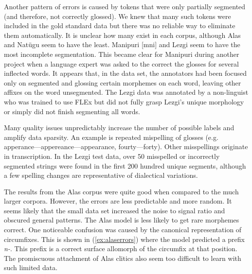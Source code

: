 Another pattern of errors is caused by tokens that were only partially segmented (and therefore, not correctly glossed). We knew that many such tokens were included in the gold standard data but there was no reliable way to eliminate them automatically. It is unclear how many exist in each corpus, although Alas and Nat\"ugu seem to have the least. Manipuri [mni] and Lezgi seem to have the most incomplete segmentation. This became clear for Manipuri during another project when a language expert was asked to the correct the glosses for several inflected words. It appears that, in the data set, the annotators had been focused only on segmented and glossing certain morphemes on each word, leaving other affixes on the word unsegmented. 
The Lezgi data was annotated by a non-linguist who was trained to use FLEx but did not fully grasp Lezgi's unique morphology or simply did not finish segmenting all words. 

Many quality issues unpredictably increase the number of possible labels and amplify data sparsity. An example is
repeated mispelling of glosses (e.g. apperance---appereance---appearance, fourty---forty). Other misspellings originate in transcription. In the Lezgi test data, over 50 misspelled or incorrectly segmented strings were found in the first 200 hundred unique segments, although a few spelling changes are representative of dialectical variations.  


The results from the Alas corpus were quite good when compared to the much larger corpora. However, the errors are less predictable and more random. It seems likely that the small data set increased the noise to signal ratio and obscured general patterns. 
The Alas model is less likely to get rare morphemes correct. 
One noticeable confusion was caused by the canonical representation of circumfixes. This is shown in (\ref{ex:alaserrors}) where the model predicted a prefix \textit{n-}. This prefix is a correct surface allomorph of the circumfix at that position. 
The promiscuous attachment of Alas clitics also seem too difficult to learn with such limited data.

